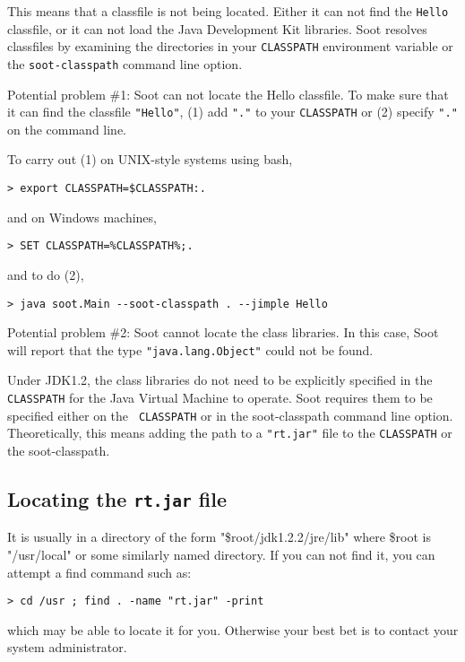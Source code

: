 \documentclass{article}
\begin{document}
This means that a classfile is not being located.  Either it can not
find the {\tt Hello} classfile, or it can not load the Java
Development Kit libraries.  Soot resolves classfiles by examining the
directories in your {\tt CLASSPATH} environment variable or the
{\tt soot-classpath} command line option.

Potential problem \#1: Soot can not locate the Hello classfile. To make
sure that it can find the classfile {\tt "Hello"}, (1) add {\tt "."} 
to your {\tt CLASSPATH} or (2) specify {\tt "."} on the command line.

To carry out (1) on UNIX-style systems using bash,
\begin{verbatim}
> export CLASSPATH=$CLASSPATH:.
\end{verbatim}
and on Windows machines,
\begin{verbatim}
> SET CLASSPATH=%CLASSPATH%;.
\end{verbatim}

and to do (2), 
\begin{verbatim}
> java soot.Main --soot-classpath . --jimple Hello
\end{verbatim}

Potential problem \#2: Soot cannot locate the class libraries.  In this
case, Soot will report that the type {\tt "java.lang.Object"} could not
be found.

Under JDK1.2, the class libraries do not need to be explicitly
specified in the {\tt CLASSPATH} for the Java Virtual Machine to
operate.  Soot requires them to be specified either on the {\tt
CLASSPATH} or in the soot-classpath command line option.
Theoretically, this means adding the path to a {\tt "rt.jar"} file to the
{\tt CLASSPATH} or the soot-classpath.

\subsection{Locating the {\tt rt.jar} file}

It is usually in a directory of the form "\$root/jdk1.2.2/jre/lib"
where \$root is "/usr/local" or some similarly named directory.  If you
can not find it, you can attempt a find command such as:

\begin{verbatim}
> cd /usr ; find . -name "rt.jar" -print
\end{verbatim}

which may be able to locate it for you.  Otherwise your best bet is to contact
your system administrator.
\end{document}
